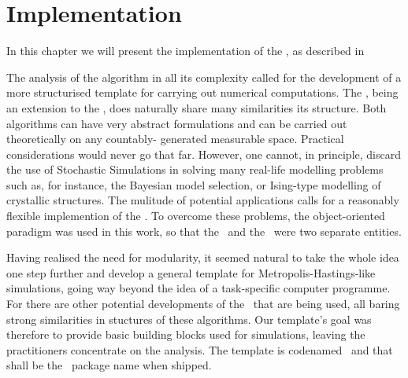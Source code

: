 \documentclass{book}
\begin{document}
\chapter{ Implementation }\label{Implementation}

In this chapter we will present the implementation of the \PTalgo, as described in 

The analysis of the algorithm in all its complexity called for the development
of a more structurised template for carrying out numerical computations. The
\PTalgo, being an extension to the \MHalgo, does naturally share many similarities its structure. Both algorithms can have very
abstract formulations and can be carried out theoretically on any countably-
generated measurable space. Practical considerations would never go that far.
However, one cannot, in principle, discard the use of Stochastic Simulations in solving many real-life modelling problems such as, for instance, the Bayesian model selection, or Ising-type modelling of crystallic structures. The mulitude of potential applications calls for a reasonably flexible implemention of the \PTalgo. To overcome these problems, the object-oriented paradigm was used in this work, so that the \sspace\, and the \algo\, were two separate entities. 

Having realised the need for modularity, it seemed natural to take the whole idea one step further and develop a general template for Metropolis-Hastings-like simulations, going way beyond the idea of a task-specific computer programme. For there are other potential developments of the \MHalgo\, that are being used, all baring strong similarities in stuctures of these algorithms. Our template's goal was therefore to provide basic building blocks used for simulations, leaving the practitioners concentrate on the analysis. The template is codenamed \ssimul \, and that shall be the \RR\, package name when shipped.
\end{document}
